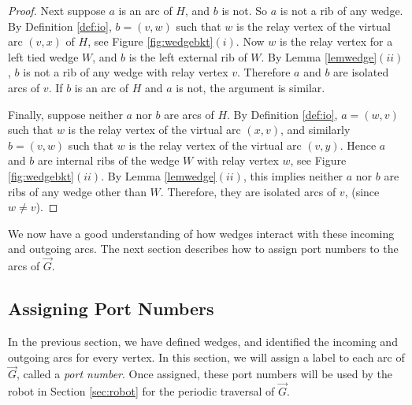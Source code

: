 \documentclass[12pt,letterpaper,oneside]{book}
\begin{document}
\begin{proof}
Next suppose $a$ is an arc of $H$, and $b$ is not.  So $a$ is not a rib of any wedge.  By Definition \ref{def:io}, 
$b=(v,w)$ such that $w$ is the relay vertex of the virtual arc $(v,x)$ of $H$, see Figure \ref{fig:wedgebkt}$(i)$.  Now 
$w$ is the relay vertex for a left tied wedge $W$, and $b$ is the left external rib of $W$.  
By Lemma \ref{lemwedge}$(ii)$, $b$ is not a rib of any wedge with relay vertex $v$.  Therefore $a$ and $b$ are isolated arcs of $v$.  
If $b$ is an arc of $H$ and $a$ is not, the argument is similar.  



Finally, suppose neither $a$ nor $b$ are arcs of $H$.  By Definition \ref{def:io}, $a=(w,v)$ such that $w$ is the relay vertex of the 
virtual arc $(x,v)$, and similarly $b=(v,w)$ such that $w$ is the relay vertex of the virtual arc $(v,y)$.  Hence $a$ and $b$ are 
internal ribs of the wedge $W$ with relay vertex $w$, see Figure \ref{fig:wedgebkt}$(ii)$.  
By Lemma \ref{lemwedge}$(ii)$, this implies neither $a$ nor $b$ are ribs of any wedge other than $W$.  Therefore, 
they are isolated arcs of $v$, (since $w\ne v$).  


\end{proof} 



We now have a good understanding of how wedges interact with these incoming and outgoing arcs.  
The next section describes how to assign port numbers to the arcs of $\vec{G}$.

\newpage
\subsection{Assigning Port Numbers}
\label{sec:pn}


In the previous section, we have defined wedges, and identified the incoming and outgoing arcs for every vertex.  
In this section, we will assign a label 
to each arc of $\vec{G}$, called a \emph{port number}.  
Once assigned, these port numbers will be 
used by the robot in Section \ref{sec:robot} for the periodic traversal of $\vec{G}$.  
\end{document}
